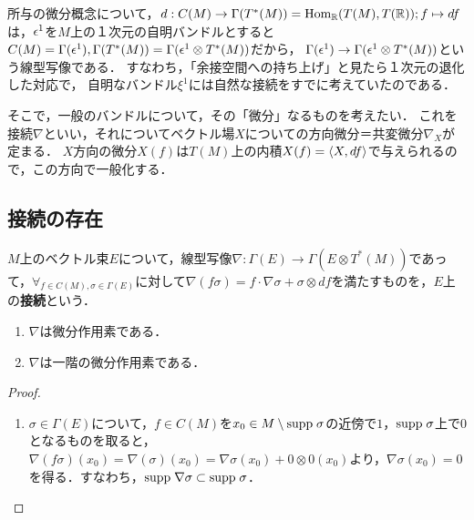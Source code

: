 \documentclass[uplatex,dvipdfmx]{jsreport}
\begin{document}
\begin{tcolorbox}[colframe=ForestGreen, colback=ForestGreen!10!white,breakable,colbacktitle=ForestGreen!40!white,coltitle=black,fonttitle=\bfseries\sffamily,
title=接続とそれが定める共変微分]
    所与の微分概念について，$d:C(M)\to\Gamma(T^*(M))=\mathrm{Hom}_{\mathbb{R}}(T(M),T(\mathbb{R}));f\mapsto df$は，$\epsilon^1$を$M$上の１次元の自明バンドルとすると$C(M)=\Gamma(\epsilon^1),\Gamma(T^*(M))=\Gamma(\epsilon^1\otimes T^*(M))$だから，
    $\Gamma(\epsilon^1)\to\Gamma(\epsilon^1\otimes T^*(M))$という線型写像である．
    すなわち，「余接空間への持ち上げ」と見たら１次元の退化した対応で，
    自明なバンドル$\xi^1$には自然な接続をすでに考えていたのである．

    そこで，一般のバンドルについて，その「微分」なるものを考えたい．
    これを接続$\nabla$といい，それについてベクトル場$X$についての方向微分＝共変微分$\nabla_X$が定まる．
    $X$方向の微分$X(f)$は$T(M)$上の内積$X(f)=\langle X,df\rangle$で与えられるので，この方向で一般化する．
\end{tcolorbox}

\subsection{接続の存在}

\begin{definition}[connection]
    $M$上のベクトル束$E$について，線型写像$\nabla:\Gamma(E)\to\Gamma(E\otimes T^*(M))$であって，$\forall_{f\in C(M),\sigma\in\Gamma(E)}$に対して$\nabla(f\sigma)=f\cdot\nabla\sigma+\sigma\otimes df$を満たすものを，$E$上の\textbf{接続}という．
\end{definition}

\begin{lemma}\mbox{}
    \begin{enumerate}
        \item $\nabla$は微分作用素である．
        \item $\nabla$は一階の微分作用素である．
    \end{enumerate}
\end{lemma}
\begin{proof}\mbox{}
    \begin{enumerate}
        \item $\sigma\in\Gamma(E)$について，$f\in C(M)$を$x_0\in M\setminus\mathrm{supp}\;\sigma$の近傍で$1$，$\mathrm{supp}\;\sigma$上で$0$となるものを取ると，$\nabla(f\sigma)(x_0)=\nabla(\sigma)(x_0)=\nabla\sigma(x_0)+0\otimes 0(x_0)$より，$\nabla\sigma(x_0)=0$を得る．すなわち，$\mathrm{supp}\;\nabla\sigma\subset\mathrm{supp}\;\sigma$．
    \end{enumerate}
\end{proof}
\end{document}
